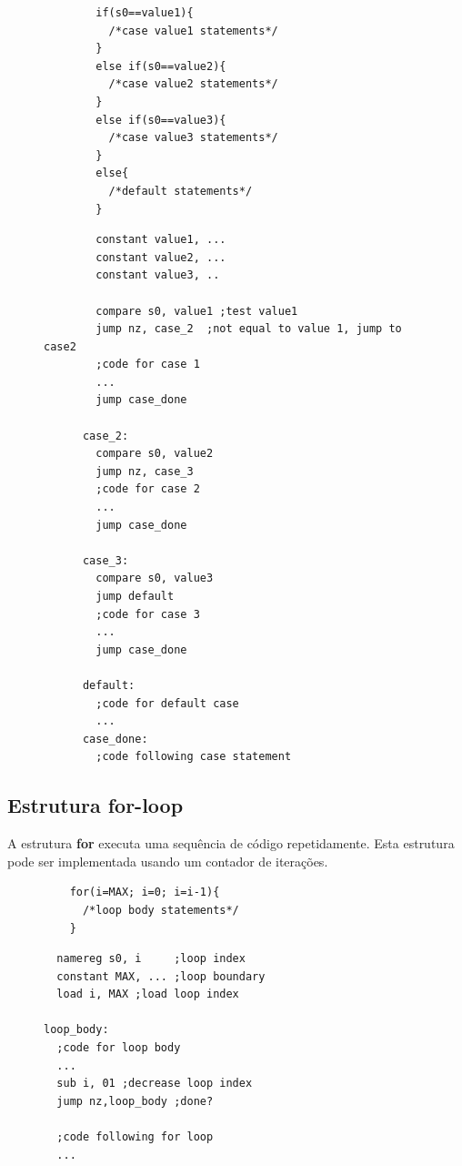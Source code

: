 \documentclass{article}
\begin{document}
\begin{figure}[!h]
  \centering
  \begin{minipage}{0.45\textwidth}
    \begin{lstlisting}
        if(s0==value1){
          /*case value1 statements*/
        }
        else if(s0==value2){
          /*case value2 statements*/
        }
        else if(s0==value3){
          /*case value3 statements*/
        }
        else{
          /*default statements*/
        }
      \end{lstlisting} 
  \end{minipage}\hfill
  \begin{minipage}{0.40\textwidth}
    \begin{lstlisting}
        constant value1, ...
        constant value2, ...
        constant value3, ..

        compare s0, value1 ;test value1
        jump nz, case_2  ;not equal to value 1, jump to case2
        ;code for case 1
        ...
        jump case_done

      case_2:
        compare s0, value2  
        jump nz, case_3
        ;code for case 2
        ...
        jump case_done

      case_3:
        compare s0, value3  
        jump default
        ;code for case 3
        ...
        jump case_done

      default:
        ;code for default case 
        ...
      case_done:
        ;code following case statement
    \end{lstlisting} 
  \end{minipage}
\end{figure}
\newpage
\subsection{Estrutura for-loop}
A estrutura \textbf{for} executa uma sequência de código repetidamente. Esta estrutura pode ser implementada usando um contador de iterações.
\begin{figure}[!h]
  \centering
  \begin{minipage}{0.45\textwidth}

    \begin{lstlisting}
    for(i=MAX; i=0; i=i-1){
      /*loop body statements*/
    }
    \end{lstlisting}

  \end{minipage}\hfill
  \begin{minipage}{0.45\textwidth}
    \begin{lstlisting}
  namereg s0, i     ;loop index
  constant MAX, ... ;loop boundary
  load i, MAX ;load loop index  

loop_body:
  ;code for loop body
  ...
  sub i, 01 ;decrease loop index
  jump nz,loop_body ;done?

  ;code following for loop
  ...
    \end{lstlisting}

  \end{minipage}
\end{figure}
\end{document}
